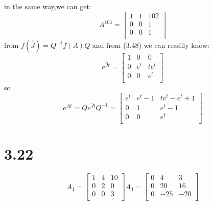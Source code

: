 \documentclass{article}
\begin{document}
in the same way,we can get:
\[
A^{103}=
\left[
\begin{array}{ccc}
1 & 1 & 102\\
0 & 0 & 1\\
0 & 0 & 1\\
\end{array}
\right]    
\]
from $f(\hat{J})=Q^{-1}f(A)Q$ and from (3.48) we can readily know:
\[e^{\hat{J}t}=
\left[
\begin{array}{ccc}
1 & 0 & 0\\
0 &e^{t} & te^{t}\\
0 & 0 & e^{t}\\
\end{array}
\right]
\] 
so 
\[e^{At}=Qe^{\hat{J}t}Q^{-1}
=\left[
\begin{array}{ccc}
e^t & e^t-1 & te^t-e^t+1\\
0 & 1 & e^t-1\\
0 & 0 & e^t\\   
\end{array}
\right]
\]

\section*{3.22}
\[
A_1=
\left[
\begin{array}{ccc}
1 & 4 & 10\\
0 & 2 & 0\\
0 & 0 &3\\   
\end{array}
\right]
A_4=
\left[
\begin{array}{ccc}
0 & 4 &3\\
0 & 20 & 16\\
0 & -25 &-20\\
\end{array}
\right]
\]
\end{document}
